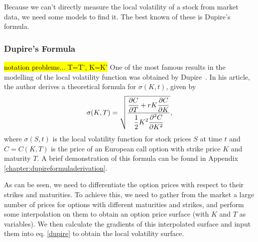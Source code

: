 Because we can't directly measure the local volatility of a stock from market data, we need some models to find it. The best known of these is Dupire's formula.

\subsubsection{Dupire's Formula}
\label{subsubsection:Dupire}
\hl{notation problems... T=T', K=K'}
One of the most famous results in the modelling of the local volatility function was obtained by Dupire~\cite{Dupire}. In his article, the author derives a theoretical formula for $\sigma(K,t)$, given by
\begin{equation}\label{dupire}
\sigma(K,T)=\sqrt{\frac{\displaystyle\pdv{C}{T}+rK\pdv{C}{K}}{\displaystyle\frac{1}{2}K^2\pdv{^2C}{K^2}}},
\end{equation}
\noindent where $\sigma(S,t)$ is the local volatility function for stock prices $S$ at time $t$ and $C=C(K,T)$ is the price of an European call option with strike price $K$ and maturity $T$.
A brief demonstration of this formula can be found in Appendix \ref{chapter:dupireformuladerivation}.


As can be seen, we need to differentiate the option prices with respect to their strikes and maturities. To achieve this, we need to gather from the market a large number of prices for options with different maturities and strikes, and perform some interpolation on them to obtain an option price surface (with $K$ and $T$ as variables). We then calculate the gradients of this interpolated surface and input them into eq. \ref{dupire} to obtain the local volatility surface.

